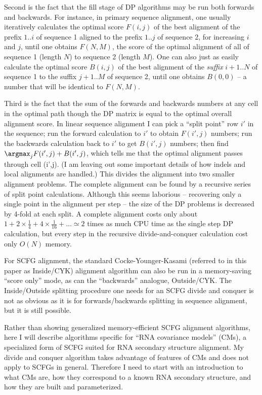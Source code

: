 Second is the fact that the fill stage of DP algorithms may be run
both forwards and backwards. For instance, in primary sequence
alignment, one usually iteratively calculates the optimal score
$F(i,j)$ of the best alignment of the prefix $1..i$ of sequence 1
aligned to the prefix $1..j$ of sequence 2, for increasing $i$ and
$j$, until one obtains $F(N,M)$, the score of the optimal alignment of
all of sequence 1 (length $N$) to sequence 2 (length $M$). One can
also just as easily calculate the optimal score $B(i,j)$ of the best
alignment of the
\emph{suffix} $i+1..N$ of sequence 1 to the suffix $j+1..M$ of sequence 2,
until one obtains $B(0,0)$ -- a number that will be identical to
$F(N,M)$.

Third is the fact that the sum of the forwards and backwards numbers
at any cell in the optimal path though the DP matrix is equal to the
optimal overall alignment score. In linear sequence alignment I can
pick a ``split point'' row $i'$ in the sequence; run the forward
calculation to $i'$ to obtain $F(i',j)$ numbers; run the backwards
calculation back to $i'$ to get $B(i',j)$ numbers; then find
$\argmax_j F(i',j) + B(i',j)$, which tells me that the optimal
alignment passes through cell (i',j). (I am leaving out some important
details of how indels and local alignments are handled.) This divides
the alignment into two smaller alignment problems. The complete
alignment can be found by a recursive series of split point
calculations. Although this seems laborious -- recovering only a
single point in the alignment per step -- the size of the DP problems
is decreased by 4-fold at each split. A complete alignment costs only
about $1 + 2 \times \frac{1}{4} + 4 \times \frac{1}{16} + \ldots
\simeq 2$ times as much CPU time as the single step DP calculation,
but every step in the recursive divide-and-conquer calculation cost
only $O(N)$ memory.

For SCFG alignment, the standard Cocke-Younger-Kasami (referred to in
this paper as Inside/CYK) alignment algorithm can also be run in a
memory-saving ``score only'' mode, as can the ``backwards'' analogue,
Outside/CYK. The Inside/Outside splitting procedure one needs for an
SCFG divide and conquer is not as obvious as it is for
forwards/backwards splitting in sequence alignment, but it is still
possible.

Rather than showing generalized memory-efficient SCFG alignment
algorithms, here I will describe algorithms specific for ``RNA
covariance models'' (CMs), a specialized form of SCFG suited for RNA
secondary structure alignment. My divide and conquer algorithm takes
advantage of features of CMs and does not apply to SCFGs in
general. Therefore I need to start with an introduction to what CMs
are, how they correspond to a known RNA secondary structure, and how
they are built and parameterized.
      
